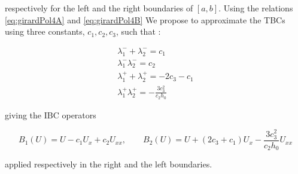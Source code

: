\indent respectively for the left and the right boundaries of $[a,b]$. Using the relations \eqref{eq:girardPol4A}  and \eqref{eq:girardPol4B} We propose to approximate the TBCs using three constants, $c_1,c_2,c_3$, such that : 

\begin{gather*}
	\lambda^-_1 + \lambda^-_2 = c_1 \\
	\lambda^-_1 \lambda^-_2 = c_2  \\
	 \lambda^+_1 + \lambda^+_2 = -2 c_3 - c_1 \\
	 \lambda^+_1 \lambda^+_2 = -\frac{3c_3^2}{c_2h_0}
\end{gather*} 

\noindent giving the IBC operators

\begin{equation}
	B_1(U) = U  - c_1U_x + c_2 U_{xx}, \qquad B_2(U) = U + (2 c_3 + c_1)U_x - \frac{3c_3^2}{c_2h_0} U_{xx}
\end{equation}

\noindent applied respectively in the right and the left boundaries.
